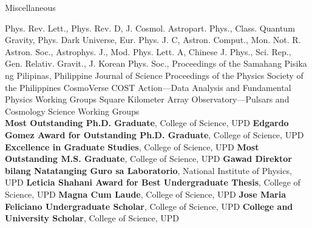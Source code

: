 \begin{rubric}{Miscellaneous}

\entry*[Referee] Phys. Rev. Lett., Phys. Rev. D, J. Cosmol. Astropart. Phys., Class. Quantum Gravity, Phys. Dark Universe, Eur. Phys. J. C, Astron. Comput., Mon. Not. R. Astron. Soc., Astrophys. J., Mod. Phys. Lett. A, Chinese J. Phys., Sci. Rep., Gen. Relativ. Gravit., J. Korean Phys. Soc., Proceedings of the Samahang Pisika ng Pilipinas, Philippine Journal of Science
%
\entry*[Editor] Proceedings of the Physics Society of the Philippines
%
\entry*[Member] CosmoVerse COST Action---Data Analysis and Fundamental Physics Working Groups
%
\entry*[] Square Kilometer Array Observatory---Pulsars and Cosmology Science Working Groups
\\
\entry*[2020] \textbf{Most Outstanding Ph.D. Graduate}, College of Science, UPD
%
\entry*[2020] \textbf{Edgardo Gomez Award for Outstanding Ph.D. Graduate}, College of Science, UPD
%
\entry*[2020] \textbf{Excellence in Graduate Studies}, College of Science, UPD
%
\entry*[2017] \textbf{Most Outstanding M.S. Graduate}, College of Science, UPD
%
\entry*[2016] \textbf{\small Gawad Direktor bilang Natatanging Guro sa Laboratorio}, National Institute of Physics, UPD
%
\entry*[2015] \textbf{Leticia Shahani Award for Best Undergraduate Thesis}, College of Science, UPD
%
\entry*[2015] \textbf{Magna Cum Laude}, College of Science, UPD
%
\entry*[2012 -- 2015] \textbf{Jose Maria Feliciano Undergraduate Scholar}, College of Science, UPD
%
\entry*[2010 -- 2015] \textbf{College and University Scholar}, College of Science, UPD
\end{rubric}